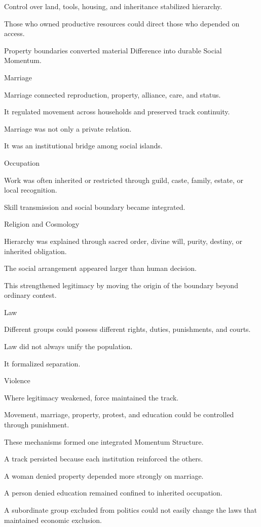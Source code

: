 Control over land, tools, housing, and inheritance stabilized hierarchy.

Those who owned productive resources could direct those who depended on access.

Property boundaries converted material Difference into durable Social Momentum.

Marriage

Marriage connected reproduction, property, alliance, care, and status.

It regulated movement across households and preserved track continuity.

Marriage was not only a private relation.

It was an institutional bridge among social islands.

Occupation

Work was often inherited or restricted through guild, caste, family, estate, or local recognition.

Skill transmission and social boundary became integrated.

Religion and Cosmology

Hierarchy was explained through sacred order, divine will, purity, destiny, or inherited obligation.

The social arrangement appeared larger than human decision.

This strengthened legitimacy by moving the origin of the boundary beyond ordinary contest.

Law

Different groups could possess different rights, duties, punishments, and courts.

Law did not always unify the population.

It formalized separation.

Violence

Where legitimacy weakened, force maintained the track.

Movement, marriage, property, protest, and education could be controlled through punishment.

These mechanisms formed one integrated Momentum Structure.

A track persisted because each institution reinforced the others.

A woman denied property depended more strongly on marriage.

A person denied education remained confined to inherited occupation.

A subordinate group excluded from politics could not easily change the laws that maintained economic exclusion.

